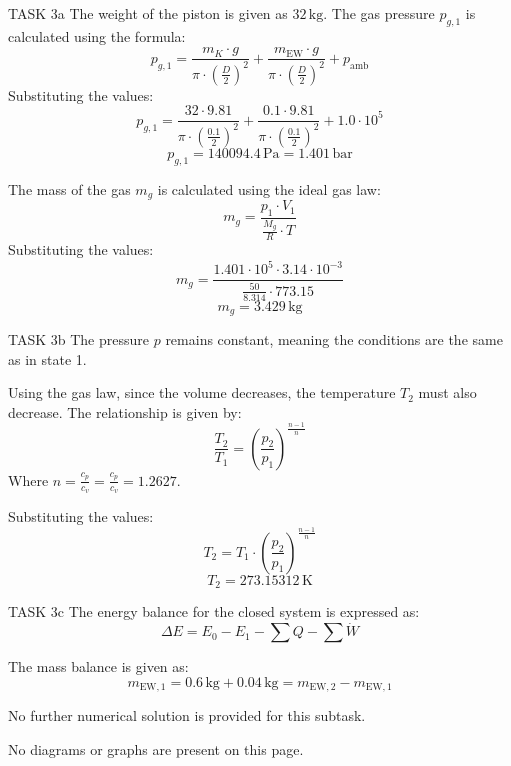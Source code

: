 TASK 3a  
The weight of the piston is given as \( 32 \, \text{kg} \). The gas pressure \( p_{g,1} \) is calculated using the formula:  
\[
p_{g,1} = \frac{m_K \cdot g}{\pi \cdot \left(\frac{D}{2}\right)^2} + \frac{m_{\text{EW}} \cdot g}{\pi \cdot \left(\frac{D}{2}\right)^2} + p_{\text{amb}}
\]  
Substituting the values:  
\[
p_{g,1} = \frac{32 \cdot 9.81}{\pi \cdot \left(\frac{0.1}{2}\right)^2} + \frac{0.1 \cdot 9.81}{\pi \cdot \left(\frac{0.1}{2}\right)^2} + 1.0 \cdot 10^5
\]  
\[
p_{g,1} = 140094.4 \, \text{Pa} = 1.401 \, \text{bar}
\]  

The mass of the gas \( m_g \) is calculated using the ideal gas law:  
\[
m_g = \frac{p_1 \cdot V_1}{\frac{M_g}{R} \cdot T}
\]  
Substituting the values:  
\[
m_g = \frac{1.401 \cdot 10^5 \cdot 3.14 \cdot 10^{-3}}{\frac{50}{8.314} \cdot 773.15}
\]  
\[
m_g = 3.429 \, \text{kg}
\]  

TASK 3b  
The pressure \( p \) remains constant, meaning the conditions are the same as in state 1.  

Using the gas law, since the volume decreases, the temperature \( T_2 \) must also decrease. The relationship is given by:  
\[
\frac{T_2}{T_1} = \left(\frac{p_2}{p_1}\right)^{\frac{n-1}{n}}
\]  
Where \( n = \frac{c_p}{c_v} = \frac{c_p}{c_v} = 1.2627 \).  

Substituting the values:  
\[
T_2 = T_1 \cdot \left(\frac{p_2}{p_1}\right)^{\frac{n-1}{n}}
\]  
\[
T_2 = 273.15312 \, \text{K}
\]  

TASK 3c  
The energy balance for the closed system is expressed as:  
\[
\Delta E = E_0 - E_1 - \sum Q - \sum \dot{W}
\]  

The mass balance is given as:  
\[
m_{\text{EW},1} = 0.6 \, \text{kg} + 0.04 \, \text{kg} = m_{\text{EW},2} - m_{\text{EW},1}
\]  

No further numerical solution is provided for this subtask.  

No diagrams or graphs are present on this page.